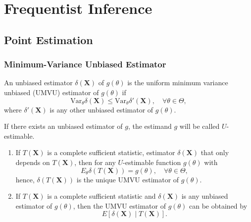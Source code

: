 \chapter{Frequentist Inference}

\section{Point Estimation}

\subsection{Minimum-Variance Unbiased Estimator}

\begin{definition}
    An unbiased estimator $\delta(\textbf{X})$ of $g(\theta)$ is the uniform minimum variance unbiased (UMVU) estimator of $g(\theta)$ if
    \begin{equation}
        \text{Var}_{\theta}\delta(\textbf{X})\leq\text{Var}_{\theta}\delta'(\textbf{X}),\quad\forall\theta\in\Theta,
    \end{equation}
    where $\delta'(\textbf{X})$ is any other unbiased estimator of $g(\theta)$.
\end{definition}

\begin{remark}
    If there exists an unbiased estimator of $g$, the estimand $g$ will be called $U$-estimable.
\end{remark}

\begin{enumerate}
    \item If $T(\textbf{X})$ is a complete sufficient statistic, estimator $\delta(\textbf{X})$ that only depends on $T(\textbf{X})$, then for any $U$-estimable function $g(\theta)$ with
          \begin{equation}
              E_{\theta}\delta(T(\textbf{X}))=g(\theta),\quad\forall\theta\in\Theta,
          \end{equation}
          hence, $\delta(T(\textbf{X}))$ is the unique UMVU estimator of $g(\theta)$.
    \item If $T(\textbf{X})$ is a complete sufficient statistic and $\delta({\textbf{X}})$ is any unbiased estimator of $g(\theta)$, then the UMVU estimator of $g(\theta)$ can be obtained by
          \begin{equation}
              E\left[\delta(\textbf{X})\mid T(\textbf{X})\right].
          \end{equation}
\end{enumerate}

